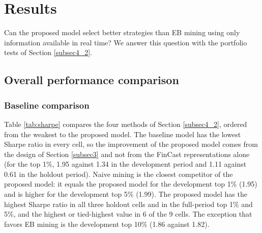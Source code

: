 \documentclass[pdflatex,sn-mathphys-num]{sn-jnl}%
\theoremstyle{thmstyleone}%
\theoremstyle{thmstyletwo}%
\theoremstyle{thmstylethree}%
\begin{document}


\section{Results}\label{sec5}

Can the proposed model select better strategies than EB mining using only information available in real time? We answer this question with the portfolio tests of Section \ref{subsec4_2}.

\subsection{Overall performance comparison}\label{subsec5_1}

\subsubsection{Baseline comparison}
Table \ref{tab:sharpe} compares the four methods of Section \ref{subsec4_2}, ordered from the weakest to the proposed model. The baseline model has the lowest Sharpe ratio in every cell, so the improvement of the proposed model comes from the design of Section \ref{subsec3} and not from the FinCast representations alone (for the top 1\%, 1.95 against 1.34 in the development period and 1.11 against 0.61 in the holdout period). Naive mining is the closest competitor of the proposed model: it equals the proposed model for the development top 1\% (1.95) and is higher for the development top 5\% (1.99). The proposed model has the highest Sharpe ratio in all three holdout cells and in the full-period top 1\% and 5\%, and the highest or tied-highest value in 6 of the 9 cells. The exception that favors EB mining is the development top 10\% (1.86 against 1.82).
\end{document}
